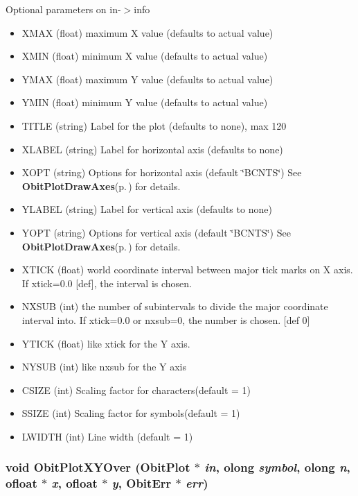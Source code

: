 Optional parameters on in-$>$info \begin{itemize}
\item XMAX (float) maximum X value (defaults to actual value) \item XMIN (float) minimum X value (defaults to actual value) \item YMAX (float) maximum Y value (defaults to actual value) \item YMIN (float) minimum Y value (defaults to actual value) \item TITLE (string) Label for the plot (defaults to none), max 120 \item XLABEL (string) Label for horizontal axis (defaults to none) \item XOPT (string) Options for horizontal axis (default \char`\"{}BCNTS\char`\"{}) See {\bf Obit\-Plot\-Draw\-Axes}{\rm (p.\,\pageref{ObitPlot_8c_a19})} for details. \item YLABEL (string) Label for vertical axis (defaults to none) \item YOPT (string) Options for vertical axis (default \char`\"{}BCNTS\char`\"{}) See {\bf Obit\-Plot\-Draw\-Axes}{\rm (p.\,\pageref{ObitPlot_8c_a19})} for details. \item XTICK (float) world coordinate interval between major tick marks on X axis. If xtick=0.0 [def], the interval is chosen. \item NXSUB (int) the number of subintervals to divide the major coordinate interval into. If xtick=0.0 or nxsub=0, the number is chosen. [def 0] \item YTICK (float) like xtick for the Y axis. \item NYSUB (int) like nxsub for the Y axis \item CSIZE (int) Scaling factor for characters(default = 1) \item SSIZE (int) Scaling factor for symbols(default = 1) \item LWIDTH (int) Line width (default = 1) \end{itemize}
\subsubsection{\setlength{\rightskip}{0pt plus 5cm}void Obit\-Plot\-XYOver ({\bf Obit\-Plot} $\ast$ {\em in}, {\bf olong} {\em symbol}, {\bf olong} {\em n}, {\bf ofloat} $\ast$ {\em x}, {\bf ofloat} $\ast$ {\em y}, {\bf Obit\-Err} $\ast$ {\em err})}\label{ObitPlot_8h_a10}



